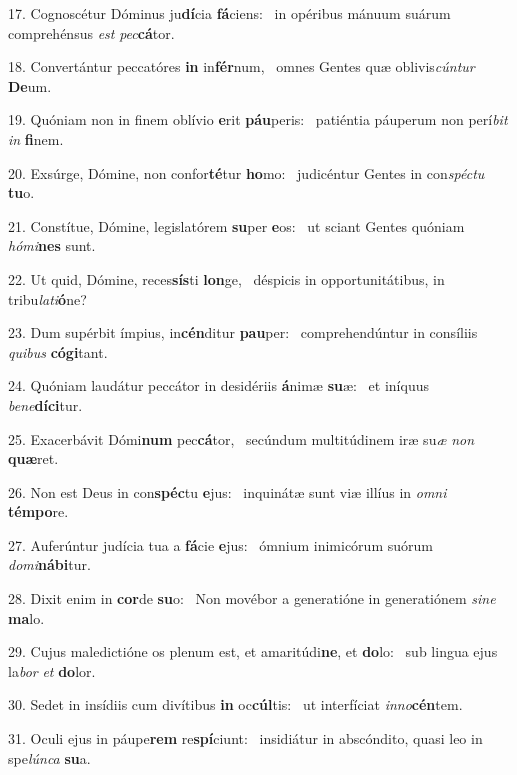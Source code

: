 17. Cognoscétur Dóminus ju\textbf{dí}cia \textbf{fá}ciens: \ast\  in opéribus mánuum suárum comprehénsus \textit{est} \textit{pec}\textbf{cá}tor.\

18. Convertántur peccatóres \textbf{in} in\textbf{fér}num, \ast\  omnes Gentes quæ oblivis\textit{cún}\textit{tur} \textbf{De}um.\

19. Quóniam non in finem oblívio \textbf{e}rit \textbf{páu}peris: \ast\  patiéntia páuperum non perí\textit{bit} \textit{in} \textbf{fi}nem.\

20. Exsúrge, Dómine, non confor\textbf{té}tur \textbf{ho}mo: \ast\  judicéntur Gentes in con\textit{spéc}\textit{tu} \textbf{tu}o.\

21. Constítue, Dómine, legislatórem \textbf{su}per \textbf{e}os: \ast\  ut sciant Gentes quóniam \textit{hó}\textit{mi}\textbf{nes} sunt.\

22. Ut quid, Dómine, reces\textbf{sís}ti \textbf{lon}ge, \ast\  déspicis in opportunitátibus, in tribu\textit{la}\textit{ti}\textbf{ó}ne?\

23. Dum supérbit ímpius, in\textbf{cén}ditur \textbf{pau}per: \ast\  comprehendúntur in consíliis \textit{qui}\textit{bus} \textbf{có}\textbf{gi}tant.\

24. Quóniam laudátur peccátor in desidériis \textbf{á}nimæ \textbf{su}æ: \ast\  et iníquus \textit{be}\textit{ne}\textbf{dí}\textbf{ci}tur.\

25. Exacerbávit Dómi\textbf{num} pec\textbf{cá}tor, \ast\  secúndum multitúdinem iræ su\textit{æ} \textit{non} \textbf{quæ}ret.\

26. Non est Deus in con\textbf{spéc}tu \textbf{e}jus: \ast\  inquinátæ sunt viæ illíus in \textit{om}\textit{ni} \textbf{tém}\textbf{po}re.\

27. Auferúntur judícia tua a \textbf{fá}cie \textbf{e}jus: \ast\  ómnium inimicórum suórum \textit{do}\textit{mi}\textbf{ná}\textbf{bi}tur.\

28. Dixit enim in \textbf{cor}de \textbf{su}o: \ast\  Non movébor a generatióne in generatiónem \textit{si}\textit{ne} \textbf{ma}lo.\

29. Cujus maledictióne os plenum est, et amaritúdi\textbf{ne}, et \textbf{do}lo: \ast\  sub lingua ejus la\textit{bor} \textit{et} \textbf{do}lor.\

30. Sedet in insídiis cum divítibus \textbf{in} oc\textbf{cúl}tis: \ast\  ut interfíciat \textit{in}\textit{no}\textbf{cén}tem.\

31. Oculi ejus in páupe\textbf{rem} re\textbf{spí}ciunt: \ast\  insidiátur in abscóndito, quasi leo in spe\textit{lún}\textit{ca} \textbf{su}a.\

